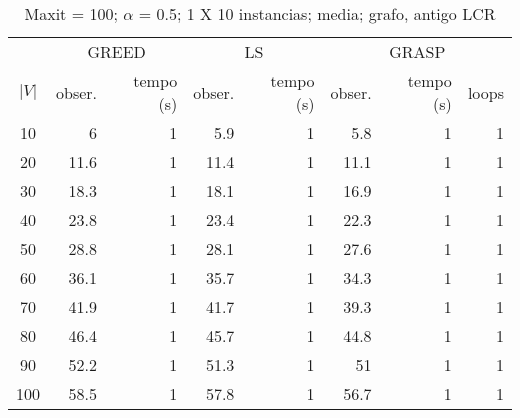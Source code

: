 \documentclass[]{article}
\begin{document}
\begin {table}[ht]
\centering
\caption{Maxit = 100; $\alpha$ = 0.5; 1 X 10 instancias; media; grafo, antigo LCR}
\begin{small}
	\begin{tabular}{|c|r|r|r|r|r|r|r|}
		\hline
		& \multicolumn{2}{c|}{GREED} & \multicolumn{2}{c|}{LS} & \multicolumn{3}{c|}{GRASP} \\ 
		\cline{2-8}
		$|V|$   &  obser. & tempo (s)  & obser. & tempo (s) & obser. & tempo (s) & loops\\ 
		\hline
		10 & 6 & 1 & 5.9 & 1 & 5.8 & 1 & 1 \\ 
		20 & 11.6 & 1 & 11.4 & 1 & 11.1 & 1 & 1 \\ 
		30 & 18.3 & 1 & 18.1 & 1 & 16.9 & 1 & 1 \\ 
		40 & 23.8 & 1 & 23.4 & 1 & 22.3 & 1 & 1 \\ 
		50 & 28.8 & 1 & 28.1 & 1 & 27.6 & 1 & 1 \\ 
		60 & 36.1 & 1 & 35.7 & 1 & 34.3 & 1 & 1 \\ 
		70 & 41.9 & 1 & 41.7 & 1 & 39.3 & 1 & 1 \\ 
		80 & 46.4 & 1 & 45.7 & 1 & 44.8 & 1 & 1 \\ 
		90 & 52.2 & 1 & 51.3 & 1 & 51 & 1 & 1 \\ 
		100 & 58.5 & 1 & 57.8 & 1 & 56.7 & 1 & 1 \\ 
		\hline
	\end{tabular} \label{}
\end{small}
\end{table}
\end{document}
